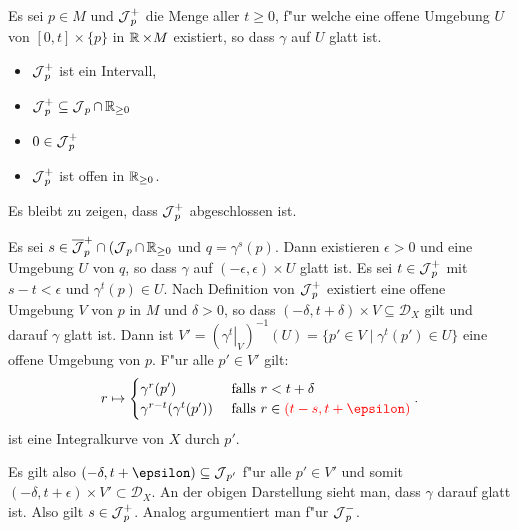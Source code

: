 \begin{bew}
Es sei $p \in M$ und $\operatorname{\mathcal{J}}_p^{+}$ die Menge aller $t \geq 0$, f"ur welche eine offene Umgebung $U$ von $[0,t] \times \{p\}$ in $\operatorname{\mathbb{R}} \times M$ existiert, so dass $\gamma$ auf $U$ glatt ist.
\begin{itemize}
\item $\operatorname{\mathcal{J}}_p^{+}$ ist ein Intervall,
\item $\operatorname{\mathcal{J}}_p^{+} \subseteq \operatorname{\mathcal{J}}_p \cap \operatorname{\mathbb{R}}_{\geq 0}$
\item $0 \in \operatorname{\mathcal{J}}_p^{+}$
\item $\operatorname{\mathcal{J}}_p^{+}$ ist offen in $\operatorname{\mathbb{R}}_{\geq 0}$.
\end{itemize}
Es bleibt zu zeigen, dass $\operatorname{\mathcal{J}}_p^{+}$ abgeschlossen ist.

Es sei $s \in \overline {\operatorname{\mathcal{J}}}_p^{+} \cap (\operatorname{\mathcal{J}}_p \cap \operatorname{\mathbb{R}}_{\geq 0}$ und $q = \gamma^s(p)$.
Dann existieren $\epsilon > 0$ und eine Umgebung $U$ von $q$, so dass $\gamma$ auf $(-\epsilon,\epsilon) \times U$ glatt ist.
Es sei $t \in \operatorname{\mathcal{J}}_p^{+}$ mit $s-t < \epsilon$ und $\gamma^t(p) \in U$.
Nach Definition von $\operatorname{\mathcal{J}}_p^{+}$ existiert eine offene Umgebung $V$ von $p$ in $M$ und $\delta > 0$, so dass $(-\delta,t+\delta)\times V \subseteq \mathcal D_X$ gilt und darauf $\gamma$ glatt ist.
Dann ist $V' = \left(\left.\gamma^t\right|_V\right)^{-1}(U) = \{p' \in V \mid \gamma^t(p') \in U\}$ eine offene Umgebung von $p$.
F"ur alle $p' \in V'$ gilt:
\begin{align*}
	r \mapsto
	\begin{cases}
		\gamma^r(p') & \text{ falls } r < t+\delta\\
		\gamma^{r-t}(\gamma^t(p')) & \text{ falls } r \in \textcolor{red}{(t-s,t+\epsilon)}
	\end{cases}.
\end{align*}
ist eine Integralkurve von $X$ durch $p'$.

Es gilt also $(-\delta,t+\epsilon) \subseteq \calJ_{p'}$ f"ur alle $p' \in V'$ und somit $(-\delta,t+\epsilon) \times V' \subset \mathcal D_X$. An der obigen Darstellung sieht man, dass $\gamma$ darauf glatt ist.
Also gilt $s \in \operatorname{\mathcal{J}}_p^{+}$. Analog argumentiert man f"ur $\operatorname{\mathcal{J}}_p^{-}$.
\end{bew}

